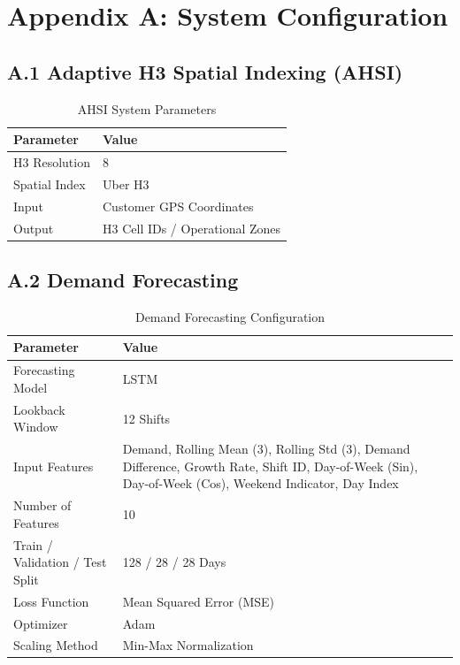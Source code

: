 \documentclass{article}
\begin{document}
\newpage
\section*{Appendix A: System Configuration}

\subsection*{A.1 Adaptive H3 Spatial Indexing (AHSI)}
\begin{table}[htbp]
\centering
\caption{AHSI System Parameters}
\label{tab:ahsi_config}
\begin{tabular}{ll}
\toprule
\textbf{Parameter} & \textbf{Value} \\
\midrule
H3 Resolution & 8 \\
Spatial Index & Uber H3 \\
Input & Customer GPS Coordinates \\
Output & H3 Cell IDs / Operational Zones \\
\bottomrule
\end{tabular}
\end{table}

\subsection*{A.2 Demand Forecasting}
\begin{table}[htbp]
\centering
\caption{Demand Forecasting Configuration}
\label{tab:forecasting_config}
\begin{tabularx}{\linewidth}{l X}
\toprule
\textbf{Parameter} & \textbf{Value} \\
\midrule
Forecasting Model & LSTM \\
Lookback Window & 12 Shifts \\
Input Features & Demand, Rolling Mean (3), Rolling Std (3), Demand Difference, Growth Rate, Shift ID, Day-of-Week (Sin), Day-of-Week (Cos), Weekend Indicator, Day Index \\
Number of Features & 10 \\
Train / Validation / Test Split & 128 / 28 / 28 Days \\
Loss Function & Mean Squared Error (MSE) \\
Optimizer & Adam \\
Scaling Method & Min-Max Normalization \\
\bottomrule
\end{tabularx}
\end{table}
\end{document}
